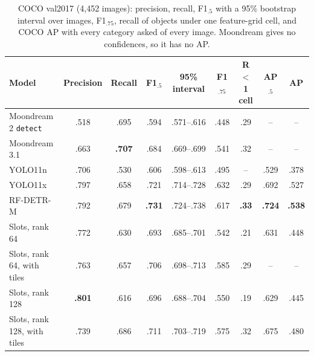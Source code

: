 \documentclass[10pt,twocolumn]{article}
\begin{document}
\begin{table}[h]
\centering\small\setlength{\tabcolsep}{6pt}
\caption{COCO val2017 (4{,}452 images): precision, recall, F1$_{.5}$ with a 95\%
bootstrap interval over images, F1$_{.75}$, recall of objects under one feature-grid
cell, and COCO AP with every category asked of every image. Moondream gives no confidences, so it has no AP.}
\label{tab:coco}
\begin{tabular}{@{}lcccccccc@{}}
\toprule
Model & Precision & Recall & F1$_{.5}$ & 95\% interval & F1$_{.75}$ & R $<$1 cell & AP$_{.5}$ & AP \\
\midrule
Moondream 2 \texttt{detect} & .518 & .695 & .594 & .571--.616 & .448 & .29 & -- & -- \\
Moondream 3.1 & .663 & \textbf{.707} & .684 & .669--.699 & .541 & .32 & -- & -- \\
YOLO11n & .706 & .530 & .606 & .598--.613 & .495 & -- & .529 & .378 \\
YOLO11x & .797 & .658 & .721 & .714--.728 & .632 & .29 & .692 & .527 \\
RF-DETR-M & .792 & .679 & \textbf{.731} & .724--.738 & .617 & \textbf{.33} & \textbf{.724} & \textbf{.538} \\
\rowcolor{rowtint} Slots, rank 64 & .772 & .630 & .693 & .685--.701 & .542 & .21 & .631 & .448 \\
\rowcolor{rowtint} Slots, rank 64, with tiles & .763 & .657 & .706 & .698--.713 & .585 & .29 & -- & -- \\
\rowcolor{rowtint} Slots, rank 128 & \textbf{.801} & .616 & .696 & .688--.704 & .550 & .19 & .629 & .445 \\
\rowcolor{rowtint} Slots, rank 128, with tiles & .739 & .686 & .711 & .703--.719 & .575 & .32 & .675 & .480 \\
\bottomrule
\end{tabular}
\end{table}
\end{document}
